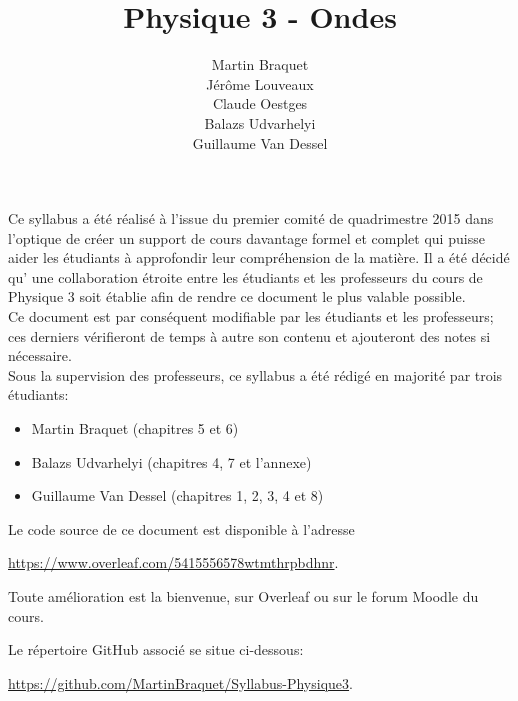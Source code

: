 \documentclass[a4paper,justified,openany]{tufte-book}
\begin{document}
	
	\title{Physique 3 - Ondes}
	\author{Martin Braquet\\Jérôme Louveaux\\Claude Oestges\\Balazs Udvarhelyi\\Guillaume Van Dessel}
	
	\newcommand{\monthyear}{%
		\ifcase\month\or January\or February\or March\or April\or May\or June\or
		July\or August\or September\or October\or November\or
		December\fi\space\number\year
	}
    
	\maketitle
	\vfill
	\begin{fullwidth}
		Ce syllabus a été réalisé à l'issue du premier comité de quadrimestre 2015 dans l'optique de créer un support de cours davantage formel et complet qui puisse aider les étudiants à approfondir leur compréhension de la matière. Il a été décidé qu' une collaboration étroite entre les étudiants et les professeurs du cours de Physique 3 soit établie afin de rendre ce document 
		le plus valable possible. \\
		Ce document est par conséquent modifiable par les étudiants et les professeurs; ces derniers vérifieront de temps à autre 
		son contenu et ajouteront des notes si nécessaire. \\
		Sous la supervision des professeurs, ce syllabus a été rédigé en majorité par trois étudiants: 
		\begin{itemize}
		 \item Martin Braquet (chapitres 5 et 6)
		 \item Balazs Udvarhelyi (chapitres 4, 7 et l'annexe)
		 \item Guillaume Van Dessel (chapitres 1, 2, 3, 4 et 8)
		\end{itemize}
	\end{fullwidth}
	\vspace{2cm}
	\begin{fullwidth}
        Le code source de ce document est disponible à l'adresse
		\begin{center}
            \url{https://www.overleaf.com/5415556578wtmthrpbdhnr}.
        \end{center}
		Toute amélioration est la bienvenue, sur Overleaf ou sur le forum Moodle du cours.
		
		Le répertoire GitHub associé se situe ci-dessous:
		\begin{center}
            \url{https://github.com/MartinBraquet/Syllabus-Physique3}.
        \end{center}
    \end{fullwidth}
\end{document}
